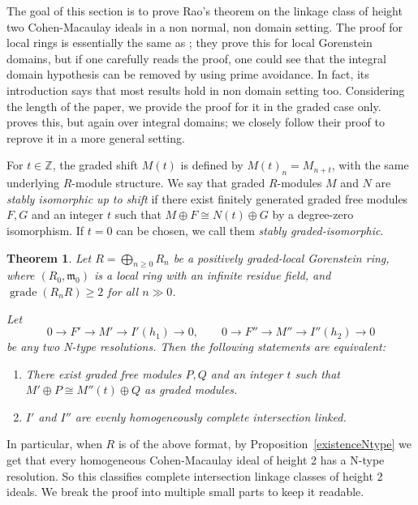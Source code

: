 \documentclass[11pt,letterpaper]{amsart}
\theoremstyle{plain}
\newtheorem{thm}{Theorem}[section]
\theoremstyle{definition}
\theoremstyle{remark}
\begin{document}
The goal of this section is to prove Rao's theorem on the linkage class of height two Cohen-Macaulay ideals in a non normal, non domain setting. The proof for local rings is essentially the same as \cite[Theorem~2.1]{herzog1987maximal}; they prove this for local Gorenstein domains, but if one carefully reads the proof, one could see that the integral domain hypothesis can be removed by using prime avoidance. In fact, its introduction says that most results hold in non domain setting too. Considering the length of the paper, we provide the proof for it in the graded case only. \cite[Theorem~6.4]{nagel1998even} proves this, but again over integral domains; we closely follow their proof to reprove it in a more general setting. 

For $t\in\mathbb Z$, the graded shift $M(t)$ is defined by $M(t)_n=M_{n+t}$, with the same underlying $R$-module structure. We say that graded $R$-modules $M$ and $N$ are \emph{stably isomorphic up to shift} if there exist finitely generated graded free modules $F,G$ and an integer $t$ such that $M\oplus F\cong N(t)\oplus G$ by a degree-zero isomorphism. If $t=0$ can be chosen, we call them \emph{stably graded-isomorphic}.

\begin{thm}\label{rao}\cite[Theorem~2.1]{herzog1987maximal}\cite[Theorem~6.4]{nagel1998even}\cite{rao1981liaison}
Let $R=\bigoplus_{n\ge0}R_n$ be a positively graded-local Gorenstein ring, where $(R_0,\mathfrak m_0)$ is a local ring with an infinite residue field, and $\operatorname{grade}(R_nR)\ge2$ for all $n\gg0$.

Let
\[
0 \longrightarrow F' \longrightarrow M' \longrightarrow I'(h_1)\longrightarrow 0,\qquad 
0 \longrightarrow F''\longrightarrow M'' \longrightarrow I''(h_2) \longrightarrow 0
\]
be any two N-type resolutions. Then the following
statements are equivalent:
\begin{enumerate}
    \item There exist graded free modules $P,Q$ and an integer $t$ such that $M'\oplus P\cong M''(t)\oplus Q$ as graded modules.
    \item \(I'\) and \(I''\) are evenly homogeneously complete intersection linked.
\end{enumerate}
\end{thm} In particular, when $R$ is of the above format, by Proposition~\ref{existenceNtype} we get that every homogeneous Cohen-Macaulay ideal of height 2 has a N-type resolution. So this classifies complete intersection linkage classes of height 2 ideals. We break the proof into multiple small parts to keep it readable. 
\end{document}
